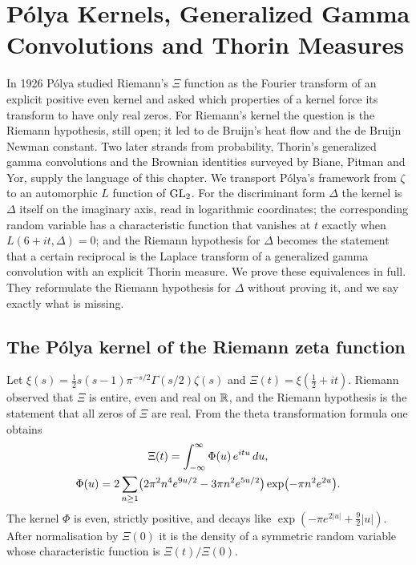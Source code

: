 \chapter{P\'olya Kernels, Generalized Gamma Convolutions and Thorin Measures}\label{ch:10}

In 1926 P\'olya studied Riemann's $\Xi$ function as the Fourier transform of an explicit positive even kernel and asked which properties of a kernel force its transform to have only real zeros. For Riemann's kernel the question is the Riemann hypothesis, still open; it led to de Bruijn's heat flow and the de Bruijn Newman constant. Two later strands from probability, Thorin's generalized gamma convolutions and the Brownian identities surveyed by Biane, Pitman and Yor, supply the language of this chapter. We transport P\'olya's framework from $\zeta$ to an automorphic $L$ function of $\mathrm{GL}_2$. For the discriminant form $\Delta$ the kernel is $\Delta$ itself on the imaginary axis, read in logarithmic coordinates; the corresponding random variable has a characteristic function that vanishes at $t$ exactly when $L(6+it,\Delta)=0$; and the Riemann hypothesis for $\Delta$ becomes the statement that a certain reciprocal is the Laplace transform of a generalized gamma convolution with an explicit Thorin measure. We prove these equivalences in full. They reformulate the Riemann hypothesis for $\Delta$ without proving it, and we say exactly what is missing.

\section{The P\'olya kernel of the Riemann zeta function}

Let $\xi(s) = \frac12 s(s-1)\pi^{-s/2}\Gamma(s/2)\zeta(s)$ and $\Xi(t) = \xi(\frac12+it)$. Riemann \cite{riemann1859} observed that $\Xi$ is entire, even and real on $\mathbb{R}$, and the Riemann hypothesis is the statement that all zeros of $\Xi$ are real. From the theta transformation formula one obtains
\begin{gather}
\Xi(t) = \int_{-\infty}^\infty \Phi(u)\,e^{itu}\,du,\label{eq:ch10polya}\\
\Phi(u) = 2\sum_{n\ge1}\bigl(2\pi^2n^4e^{9u/2} - 3\pi n^2e^{5u/2}\bigr)\exp\bigl(-\pi n^2e^{2u}\bigr).\notag
\end{gather}
The kernel $\Phi$ is even, strictly positive, and decays like $\exp(-\pi e^{2|u|}+\frac92|u|)$. After normalisation by $\Xi(0)$ it is the density of a symmetric random variable whose characteristic function is $\Xi(t)/\Xi(0)$.

